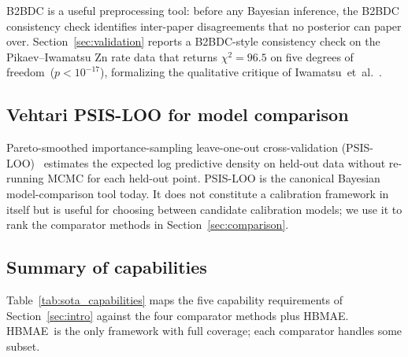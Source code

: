 \documentclass[12pt]{article}
\theoremstyle{plain}
\theoremstyle{definition}
\theoremstyle{remark}
\newcommand{\HBMAE}{HBMAE\xspace}
\begin{document}
B2BDC is a useful preprocessing tool: before any Bayesian inference, the
B2BDC consistency check identifies inter-paper disagreements that no
posterior can paper over.  Section~\ref{sec:validation} reports a B2BDC-style
consistency check on the Pikaev--Iwamatsu Zn rate data that returns
$\chi^2 = 96.5$ on five degrees of freedom~($p<10^{-17}$), formalizing the
qualitative critique of Iwamatsu~et~al.~\citep{Iwamatsu2022}.

\subsection{Vehtari PSIS-LOO for model comparison}\label{sec:sota:psisloo}

Pareto-smoothed importance-sampling leave-one-out cross-validation
(PSIS-LOO)~\citep{Vehtari2017} estimates the expected log predictive density
on held-out data without re-running MCMC for each held-out point.  PSIS-LOO
is the canonical Bayesian model-comparison tool today.  It does not
constitute a calibration framework in itself but is useful for choosing
between candidate calibration models; we use it to rank the comparator
methods in Section~\ref{sec:comparison}.

\subsection{Summary of capabilities}\label{sec:sota:summary}

Table~\ref{tab:sota_capabilities} maps the five capability requirements of
Section~\ref{sec:intro} against the four comparator methods plus \HBMAE.
\HBMAE\ is the only framework with full coverage; each comparator handles
some subset.
\end{document}
